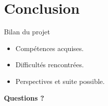 
\section{Conclusion}

\begin{frame}{Bilan du projet}
    \begin{itemize}
        \item Compétences acquises.
        \item Difficultés rencontrées.
        \item Perspectives et suite possible.
    \end{itemize}
\end{frame}

\begin{frame}
    \centering
    \Huge{\bfseries Questions ?}
\end{frame}